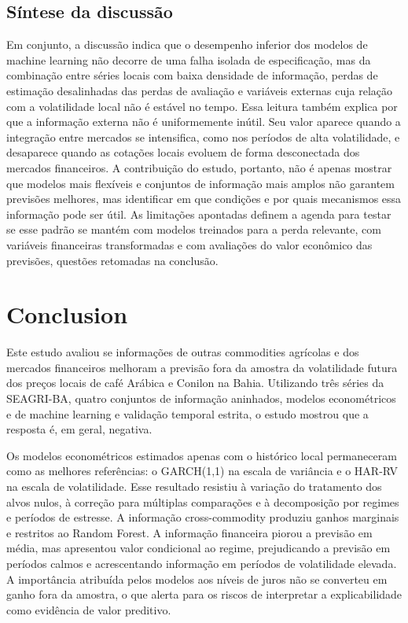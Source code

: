 \documentclass[a4paper,fleqn]{cas-sc}
\begin{document}
\subsection{Síntese da discussão}

Em conjunto, a discussão indica que o desempenho inferior dos modelos de machine learning não decorre de uma falha isolada de especificação, mas da combinação entre séries locais com baixa densidade de informação, perdas de estimação desalinhadas das perdas de avaliação e variáveis externas cuja relação com a volatilidade local não é estável no tempo. Essa leitura também explica por que a informação externa não é uniformemente inútil. Seu valor aparece quando a integração entre mercados se intensifica, como nos períodos de alta volatilidade, e desaparece quando as cotações locais evoluem de forma desconectada dos mercados financeiros. A contribuição do estudo, portanto, não é apenas mostrar que modelos mais flexíveis e conjuntos de informação mais amplos não garantem previsões melhores, mas identificar em que condições e por quais mecanismos essa informação pode ser útil. As limitações apontadas definem a agenda para testar se esse padrão se mantém com modelos treinados para a perda relevante, com variáveis financeiras transformadas e com avaliações do valor econômico das previsões, questões retomadas na conclusão.

\section{Conclusion}
\label{sec:conclusion}

Este estudo avaliou se informações de outras commodities agrícolas e dos mercados financeiros melhoram a previsão fora da amostra da volatilidade futura dos preços locais de café Arábica e Conilon na Bahia. Utilizando três séries da SEAGRI-BA, quatro conjuntos de informação aninhados, modelos econométricos e de machine learning e validação temporal estrita, o estudo mostrou que a resposta é, em geral, negativa.

Os modelos econométricos estimados apenas com o histórico local permaneceram como as melhores referências: o GARCH(1,1) na escala de variância e o HAR-RV na escala de volatilidade. Esse resultado resistiu à variação do tratamento dos alvos nulos, à correção para múltiplas comparações e à decomposição por regimes e períodos de estresse. A informação cross-commodity produziu ganhos marginais e restritos ao Random Forest. A informação financeira piorou a previsão em média, mas apresentou valor condicional ao regime, prejudicando a previsão em períodos calmos e acrescentando informação em períodos de volatilidade elevada. A importância atribuída pelos modelos aos níveis de juros não se converteu em ganho fora da amostra, o que alerta para os riscos de interpretar a explicabilidade como evidência de valor preditivo.
\end{document}
